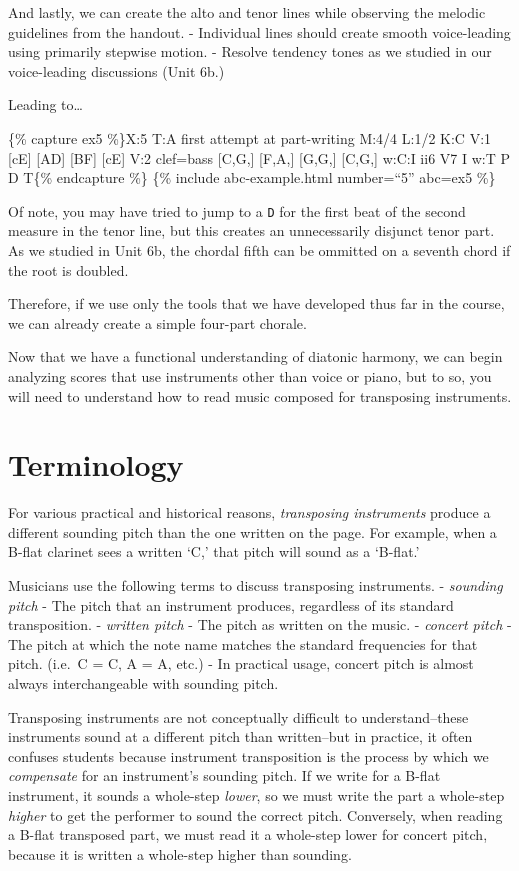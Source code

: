 \documentclass{book}
\begin{document}
And lastly, we can create the alto and tenor lines while observing the melodic
guidelines from the handout. - Individual lines should create smooth
voice-leading using primarily stepwise motion. - Resolve tendency tones as we
studied in our voice-leading discussions (Unit 6b.)

Leading to\ldots{}

\{\% capture ex5 \%\}X:5 T:A first attempt at part-writing M:4/4 L:1/2 K:C V:1
{[}cE{]} {[}AD{]}\textbar{} {[}BF{]} {[}cE{]}\textbar{]} V:2 clef=bass
{[}C,G,{]} {[}F,A,{]} \textbar{} {[}G,G,{]} {[}C,G,{]}\textbar{]} w:C:I ii6 V7
I w:T P D T\{\% endcapture \%\} \{\% include abc-example.html number=``5''
abc=ex5 \%\}

Of note, you may have tried to jump to a \texttt{D} for the first beat of the
second measure in the tenor line, but this creates an unnecessarily disjunct
tenor part. As we studied in Unit 6b, the chordal fifth can be ommitted on a
seventh chord if the root is doubled.

Therefore, if we use only the tools that we have developed thus far in the
course, we can already create a simple four-part chorale.

Now that we have a functional understanding of diatonic harmony, we can begin
analyzing scores that use instruments other than voice or piano, but to so,
you will need to understand how to read music composed for transposing
instruments.

\hypertarget{terminology}{%
\chapter{Terminology}\label{terminology}}

For various practical and historical reasons, \emph{transposing instruments}
produce a different sounding pitch than the one written on the page. For
example, when a B-flat clarinet sees a written `C,' that pitch will sound as a
`B-flat.'

Musicians use the following terms to discuss transposing instruments. -
\emph{sounding pitch} - The pitch that an instrument produces, regardless of
its standard transposition. - \emph{written pitch} - The pitch as written on
the music. - \emph{concert pitch} - The pitch at which the note name matches
the standard frequencies for that pitch. (i.e.~C = C, A = A, etc.) - In
practical usage, concert pitch is almost always interchangeable with sounding
pitch.

Transposing instruments are not conceptually difficult to understand--these
instruments sound at a different pitch than written--but in practice, it often
confuses students because instrument transposition is the process by which we
\emph{compensate} for an instrument's sounding pitch. If we write for a B-flat
instrument, it sounds a whole-step \emph{lower}, so we must write the part a
whole-step \emph{higher} to get the performer to sound the correct pitch.
Conversely, when reading a B-flat transposed part, we must read it a
whole-step lower for concert pitch, because it is written a whole-step higher
than sounding.
\end{document}
